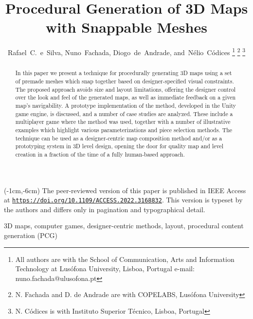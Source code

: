 \documentclass[journal]{IEEEtran}
\begin{document}
\title{Procedural Generation of 3D Maps\\with Snappable Meshes}

\author{Rafael~C.~e~Silva,
        Nuno~Fachada,
        Diogo~de~Andrade, %
        and~Nélio~Códices
\thanks{All authors are with the School of Communication, Arts and Information
Technology at Lusófona University, Lisboa, Portugal e-mail:
nuno.fachada@ulusofona.pt}
\thanks{N. Fachada and D. de Andrade are with COPELABS, Lusófona University}
\thanks{N. Códices is with Instituto Superior Técnico, Lisboa, Portugal}
}

\maketitle

\begin{textblock*}{190mm}(-1cm,-6cm)
  \noindent \footnotesize The peer-reviewed version of this paper is
  published in IEEE Access at
  \href{https://doi.org/10.1109/ACCESS.2022.3168832}{\texttt{https://doi.org/10.1109/ACCESS.2022.3168832}}.
  This version is typeset by the authors and differs only in pagination and
  typographical detail.
\end{textblock*}

\begin{abstract}
  In this paper we present a technique for procedurally generating 3D maps using a
  set of premade meshes which snap together based on designer-specified visual
  constraints. The proposed approach avoids size and layout limitations, offering
  the designer control over the look and feel of the generated maps, as well as
  immediate feedback on a given map's navigability. A prototype implementation of
  the method, developed in the Unity game engine, is discussed, and a number of
  case studies are analyzed. These include a multiplayer game where the method was
  used, together with a number of illustrative examples which highlight various
  parameterizations and piece selection methods. The technique can be used as a
  designer-centric map composition method and/or as a prototyping system in 3D
  level design, opening the door for quality map and level creation in a fraction
  of the time of a fully human-based approach.
\end{abstract}

\begin{IEEEkeywords}
3D maps, computer games, designer-centric methods, layout, procedural content
generation (PCG)
\end{IEEEkeywords}
\end{document}
